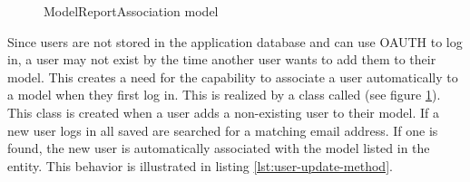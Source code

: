 \begin{figure}
    \centering

    \caption{ModelReportAssociation model}
    \label{fig:model-assoc}
\end{figure}


Since users are not stored in the application database and can use OAUTH to log in, a user may not exist by the time another user wants to add them to their model. This creates a need for the capability to associate a user automatically to a model when they first log in. This is realized by a class called  (see figure \ref{fig:model-assoc}). This class is created when a user adds a non-existing user to their model. If a new user logs in all saved  are searched for a matching email address. If one is found, the new user is automatically associated with the model listed in the  entity. This behavior is illustrated in listing \ref{lst:user-update-method}.

